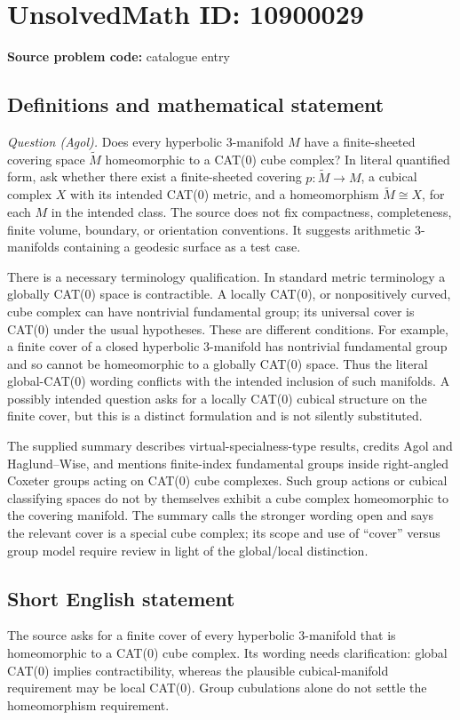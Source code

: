 \documentclass[11pt]{article}
\begin{document}
\section*{UnsolvedMath ID: 10900029}
\textbf{Source problem code:} catalogue entry
\subsection{Definitions and mathematical statement}
\emph{Question (Agol).} Does every hyperbolic \(3\)-manifold \(M\) have a finite-sheeted covering space \(\widetilde M\) homeomorphic to a CAT(0) cube complex? In literal quantified form, ask whether there exist a finite-sheeted covering \(p:\widetilde M\to M\), a cubical complex \(X\) with its intended CAT(0) metric, and a homeomorphism \(\widetilde M\cong X\), for each \(M\) in the intended class. The source does not fix compactness, completeness, finite volume, boundary, or orientation conventions. It suggests arithmetic \(3\)-manifolds containing a geodesic surface as a test case.

There is a necessary terminology qualification. In standard metric terminology a globally CAT(0) space is contractible. A locally CAT(0), or nonpositively curved, cube complex can have nontrivial fundamental group; its universal cover is CAT(0) under the usual hypotheses. These are different conditions. For example, a finite cover of a closed hyperbolic \(3\)-manifold has nontrivial fundamental group and so cannot be homeomorphic to a globally CAT(0) space. Thus the literal global-CAT(0) wording conflicts with the intended inclusion of such manifolds. A possibly intended question asks for a locally CAT(0) cubical structure on the finite cover, but this is a distinct formulation and is not silently substituted.

The supplied summary describes virtual-specialness-type results, credits Agol and Haglund--Wise, and mentions finite-index fundamental groups inside right-angled Coxeter groups acting on CAT(0) cube complexes. Such group actions or cubical classifying spaces do not by themselves exhibit a cube complex homeomorphic to the covering manifold. The summary calls the stronger wording open and says the relevant cover is a special cube complex; its scope and use of ``cover'' versus group model require review in light of the global/local distinction.
\subsection{Short English statement}
The source asks for a finite cover of every hyperbolic \(3\)-manifold that is homeomorphic to a CAT(0) cube complex. Its wording needs clarification: global CAT(0) implies contractibility, whereas the plausible cubical-manifold requirement may be local CAT(0). Group cubulations alone do not settle the homeomorphism requirement.
\end{document}
